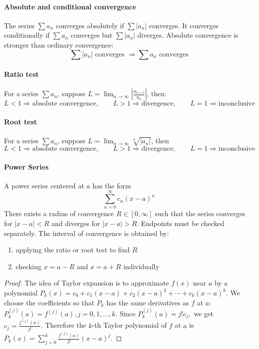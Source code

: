 \documentclass[oneside]{book}
\begin{document}
\paragraph{Absolute and conditional convergence}
The series $\sum a_n$ converges absolutely if $\sum |a_n|$ converges. It converges conditionally if $\sum a_n$ converges but $\sum |a_n|$ diverges. Absolute convergence is stronger than ordinary convergence:
\[
    \sum |a_n| \text{ converges } \Longrightarrow \sum a_n \text{ converges}
\]

\paragraph{Ratio test}
For a series $\sum a_n$, suppose $L=\lim_{n\to\infty}\left|\frac{a_{n+1}}{a_n}\right|$, then:
\[
    L<1 \Rightarrow \text{absolute convergence},\qquad
    L>1 \Rightarrow \text{divergence},\qquad
    L=1 \Rightarrow \text{inconclusive}
\]


\paragraph{Root test}
For a series $\sum a_n$, suppose $L=\lim_{n\to\infty}\sqrt[n]{|a_n|}$, then 
\[
    L<1 \Rightarrow \text{absolute convergence},\qquad
    L>1 \Rightarrow \text{divergence},\qquad
    L=1 \Rightarrow \text{inconclusive}
\]

\paragraph{Power Series} A power series centered at $a$ has the form
\[
    \sum_{n=0}^{\infty} c_n(x-a)^n
\]
There exists a radius of convergence $R\in[0,\infty]$ such that the series converges for $|x-a|<R$ and diverges for $|x-a|>R$. Endpoints must be checked separately. The interval of convergence is obtained by:
\begin{enumerate}
    \item applying the ratio or root test to find $R$
    \item checking $x=a-R$ and $x=a+R$ individually
\end{enumerate}


\begin{proof}
\noindent The idea of Taylor expansion is to approximate \(f(x)\) near \(a\) by a polynomial
$
    P_k(x)=c_0+c_1(x-a)+c_2(x-a)^2+\cdots+c_k(x-a)^k.
$
We choose the coefficients so that \(P_k\) has the same derivatives as \(f\) at \(a\):
$
    P_k^{(j)}(a)=f^{(j)}(a), j=0,1,\dots,k.
$
Since
$
    P_k^{(j)}(a)=j!c_j,
$
we get
$
    c_j=\frac{f^{(j)}(a)}{j!}.
$
Therefore the \(k\)-th Taylor polynomial of \(f\) at \(a\) is
$
    P_k(x)=\sum_{j=0}^{k}\frac{f^{(j)}(a)}{j!}(x-a)^j.
$
\end{proof}
\end{document}
